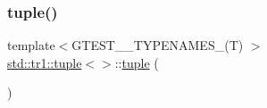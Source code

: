 \subsubsection{\texorpdfstring{tuple()}{tuple()}\hspace{0.1cm}{\footnotesize\ttfamily [1/4]}}
{\footnotesize\ttfamily template$<$G\+T\+E\+S\+T\+\_\+\_\+\+T\+Y\+P\+E\+N\+A\+M\+E\+S\+\_\+(\+T) $>$ \\
\hyperlink{classstd_1_1tr1_1_1tuple}{std\+::tr1\+::tuple}$<$$>$\+::\hyperlink{classstd_1_1tr1_1_1tuple}{tuple} (\begin{DoxyParamCaption}{ }\end{DoxyParamCaption})\hspace{0.3cm}{\ttfamily [inline]}}

\mbox{\label{classstd_1_1tr1_1_1tuple_a349b7948d183b7f05c1a5fd6aa4eaeb8}} 
